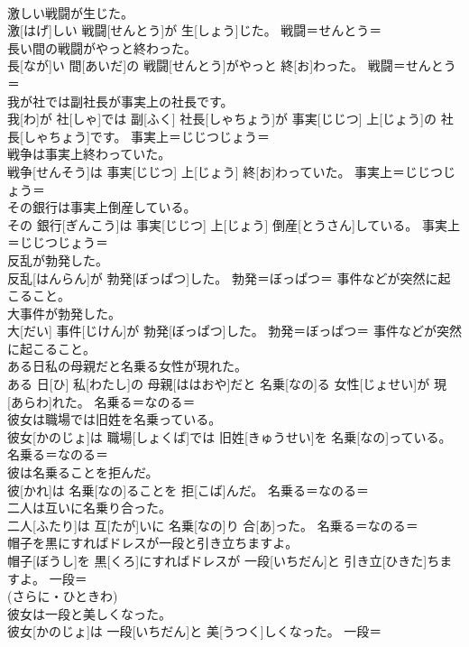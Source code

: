 \documentclass[8pt]{extreport}
\begin{document}
\begin{CJK}{UTF8}{min}
{\\	激しい戦闘が生じた。	
\\	激[はげ]しい 戦闘[せんとう]が 生[しょう]じた。	戦闘＝せんとう＝ 
\\	長い間の戦闘がやっと終わった。	
\\	長[なが]い 間[あいだ]の 戦闘[せんとう]がやっと 終[お]わった。	戦闘＝せんとう＝ 
\\	我が社では副社長が事実上の社長です。	
\\	我[わ]が 社[しゃ]では 副[ふく] 社長[しゃちょう]が 事実[じじつ] 上[じょう]の 社長[しゃちょう]です。	事実上＝じじつじょう＝ 
\\	戦争は事実上終わっていた。	
\\	戦争[せんそう]は 事実[じじつ] 上[じょう] 終[お]わっていた。	事実上＝じじつじょう＝ 
\\	その銀行は事実上倒産している。	
\\	その 銀行[ぎんこう]は 事実[じじつ] 上[じょう] 倒産[とうさん]している。	事実上＝じじつじょう＝ 
\\	反乱が勃発した。	
\\	反乱[はんらん]が 勃発[ぼっぱつ]した。	勃発＝ぼっぱつ＝ 事件などが突然に起こること。
\\	大事件が勃発した。	
\\	大[だい] 事件[じけん]が 勃発[ぼっぱつ]した。	勃発＝ぼっぱつ＝ 事件などが突然に起こること。
\\	ある日私の母親だと名乗る女性が現れた。	
\\	ある 日[ひ] 私[わたし]の 母親[ははおや]だと 名乗[なの]る 女性[じょせい]が 現[あらわ]れた。	名乗る＝なのる＝ 
\\	彼女は職場では旧姓を名乗っている。	
\\	彼女[かのじょ]は 職場[しょくば]では 旧姓[きゅうせい]を 名乗[なの]っている。	名乗る＝なのる＝ 
\\	彼は名乗ることを拒んだ。	
\\	彼[かれ]は 名乗[なの]ることを 拒[こば]んだ。	名乗る＝なのる＝ 
\\	二人は互いに名乗り合った。	
\\	二人[ふたり]は 互[たが]いに 名乗[なの]り 合[あ]った。	名乗る＝なのる＝ 
\\	帽子を黒にすればドレスが一段と引き立ちますよ。	
\\	帽子[ぼうし]を 黒[くろ]にすればドレスが 一段[いちだん]と 引き立[ひきた]ちますよ。	一段＝ 
\\	(さらに・ひときわ) 
\\	彼女は一段と美しくなった。	
\\	彼女[かのじょ]は 一段[いちだん]と 美[うつく]しくなった。	一段＝ 
}
\end{CJK}
\end{document}
